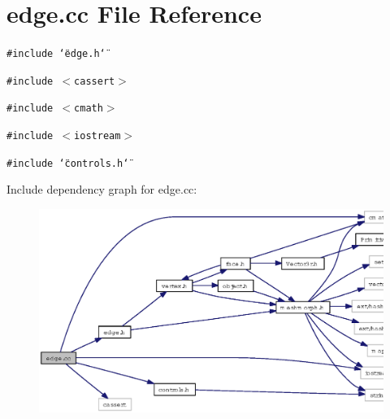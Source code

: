 \section{edge.cc File Reference}
\label{edge_8cc}
{\tt \#include \char`\"{}edge.h\char`\"{}}\par
{\tt \#include $<$cassert$>$}\par
{\tt \#include $<$cmath$>$}\par
{\tt \#include $<$iostream$>$}\par
{\tt \#include \char`\"{}controls.h\char`\"{}}\par


Include dependency graph for edge.cc:\begin{figure}[H]
\begin{center}
\leavevmode
\includegraphics[width=363pt]{edge_8cc__incl}
\end{center}
\end{figure}
